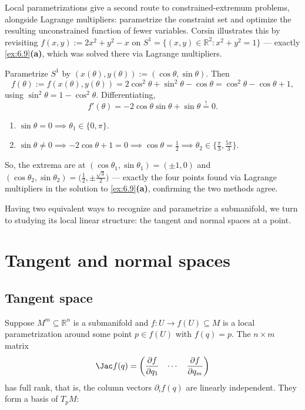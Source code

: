 \begin{remark}
Local parametrizations give a second route to constrained-extremum problems, alongside Lagrange
multipliers: parametrize the constraint set and optimize the resulting unconstrained function of
fewer variables. Corsin illustrates this by revisiting $f(x,y) := 2x^2+y^2-x$ on
$S^1 = \{(x,y)\in\mathbb{R}^2 : x^2+y^2=1\}$ --- exactly \cref{ex:6.9}\textbf{(a)}, which was
solved there via Lagrange multipliers.

Parametrize $S^1$ by $(x(\theta),y(\theta)) := (\cos\theta,\sin\theta)$. Then
\[f(\theta) := f(x(\theta),y(\theta)) = 2\cos^2\theta+\sin^2\theta-\cos\theta = \cos^2\theta-\cos\theta+1,\]
using $\sin^2\theta = 1-\cos^2\theta$. Differentiating,
\[f'(\theta) = -2\cos\theta\sin\theta+\sin\theta \overset{!}{=} 0.\]
\begin{enumerate}[label=\textbf{\arabic*.}]
  \item $\sin\theta = 0 \implies \theta_1 \in \{0,\pi\}$.
  \item $\sin\theta \neq 0 \implies -2\cos\theta+1=0 \implies \cos\theta = \tfrac12 \implies
    \theta_2 \in \{\tfrac{\pi}{3},\tfrac{5\pi}{3}\}$.
\end{enumerate}
So, the extrema are at $(\cos\theta_1,\sin\theta_1) = (\pm1,0)$ and
$(\cos\theta_2,\sin\theta_2) = \big(\tfrac12,\pm\tfrac{\sqrt3}{2}\big)$ --- exactly the four points
found via Lagrange multipliers in the solution to \cref{ex:6.9}\textbf{(a)}, confirming the two
methods agree.
\end{remark}

Having two equivalent ways to recognize and parametrize a submanifold, we turn to studying its
local linear structure: the tangent and normal spaces at a point.

\section{Tangent and normal spaces}
\label{sec:tangent_normal_spaces}

\subsection{Tangent space}

Suppose $M^m \subseteq \mathbb{R}^n$ is a submanifold and $f : U \to f(U) \subseteq M$ is a local
parametrization around some point $p \in f(U)$ with $f(q) = p$. The $n\times m$ matrix
\[\Jac f(q) = \begin{pmatrix} \dfrac{\partial f}{\partial q_1} & \cdots & \dfrac{\partial f}{\partial q_m} \end{pmatrix}\]
has full rank, that is, the column vectors $\partial_if(q)$ are linearly independent. They form a
basis of $T_pM$:

